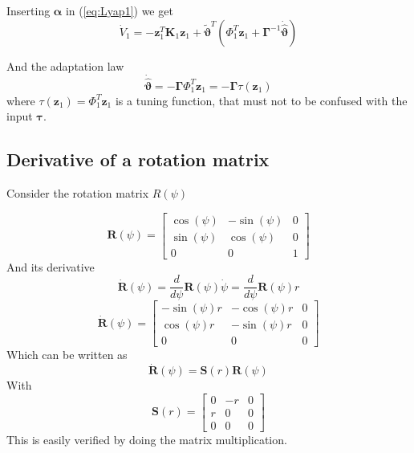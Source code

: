 \documentclass[12pt,a4]{article}
\begin{document}
Inserting $\bm{\alpha}$ in (\ref{eq:Lyap1}) we get
\begin{equation}
	\dot{V}_1 = -\bm{z}_1^T \bm{K}_1 \bm{z}_1
	+ \bm{\tilde{\vartheta}}^T \left(  \Phi_1^T\bm{z}_1 + \bm{\Gamma}^{-1}\bm{\dot{\hat{\vartheta}}} \right)
\end{equation}

And the adaptation law
\begin{equation}
	\bm{\dot{\hat{\vartheta}}} = - \bm{\Gamma} \Phi_1^T \bm{z}_1 = - \bm{\Gamma} \tau(\bm{z}_1)
\end{equation}
where $\tau(\bm{z}_1) = \Phi_1^T \bm{z}_1$ is a tuning function, that must not to be confused with the input $\bm{\tau}$.




\subsection{Derivative of a rotation matrix}
Consider the rotation matrix $R(\psi)$

\begin{equation}
	\bm{R}(\psi) = \begin{bmatrix} \cos(\psi) & -\sin(\psi) & 0 \\ \sin(\psi) & \cos(\psi) & 0 \\ 0 & 0 & 1 \end{bmatrix}
\end{equation}
And its derivative
\begin{equation}
	\bm{\dot{R}}(\psi) = \dfrac{d}{d\psi} \bm{R}(\psi) \dot{\psi} =  \dfrac{d}{d\psi} \bm{R}(\psi) r
\end{equation}
\begin{equation}
	\bm{\dot{R}}(\psi) = \begin{bmatrix} -\sin(\psi)r & -\cos(\psi)r & 0 \\ \cos(\psi)r & -\sin(\psi)r & 0 \\ 0 & 0 & 0 \end{bmatrix}
\end{equation}
Which can be written as
\begin{equation}
	\bm{\dot{R}}(\psi) = \bm{S}(r)\bm{R}(\psi)
\end{equation}
With
\begin{equation}
	\bm{S}(r) = \begin{bmatrix} 0 & -r & 0 \\ r & 0 & 0 \\ 0 & 0 & 0 \end{bmatrix}
\end{equation}
This is easily verified by doing the matrix multiplication.
\end{document}
